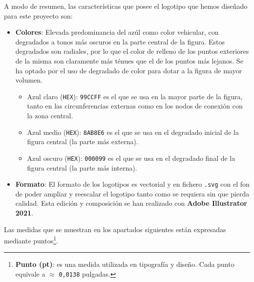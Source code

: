 \documentclass[../ei103948-project-documentation.tex]{subfiles}
\begin{document}
                            \newpage
                    
                            A modo de resumen, las características que posee el logotipo que hemos diseñado para este proyecto son:
                                \begin{itemize}
                                    \item \textbf{Colores}: Elevada predominancia del azúl como color vehicular, con degradados a tonos más oscuros en la parte central de la figura. Estos degradados son radiales, por lo que el color de relleno de los puntos exteriores de la misma son claramente más ténues que el de los puntos más lejanos. Se ha optado por el uso de degradado de color para dotar a la figura de mayor volumen.
                                        \begin{itemize}
                                            \item Azul claro (\texttt{HEX}): \texttt{99CCFF} es el que se usa en la mayor parte de la figura, tanto en las circunferencias externas como en los nodos de conexión con la zona central.
                                            \item Azul medio (\texttt{HEX}): \texttt{8AB8E6} es el que se usa en el degradado inicial de la figura central (la parte más externa).
                                            \item Azul oscuro (\texttt{HEX}): \texttt{000099} es el que se usa en el degradado final de la figura central (la parte más interna).
                                        \end{itemize}
                                    \item \textbf{Formato}: El formato de los logotipos es vectorial y en fichero \texttt{.svg} con el fon de poder ampliar y reescalar el logotipo tanto como se requiera sin que pierda calidad. Esta edición y composición se han realizado con \textbf{Adobe Illustrator 2021}.
                                \end{itemize}
                            
                                Las medidas que se muestran en los apartados siguientes están expresadas mediante puntos\footnote{\textbf{Punto (pt)}: es una medida utilizada en tipografía y diseño. Cada punto equivale a $\approx$ \texttt{0,0138} pulgadas.}.
                    
                                \newpage
                            
\end{document}
